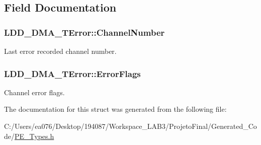 \subsection{Field Documentation}
\hypertarget{struct_l_d_d___d_m_a___t_error_abc8d0c6909178bc7fe3957b7c01afd08}{
\subsubsection[{Channel\-Number}]{ L\-D\-D\-\_\-\-D\-M\-A\-\_\-\-T\-Error\-::\-Channel\-Number}}\label{struct_l_d_d___d_m_a___t_error_abc8d0c6909178bc7fe3957b7c01afd08}
Last error recorded channel number. \hypertarget{struct_l_d_d___d_m_a___t_error_a9dd0a645e1763b4daa0058b1b29c4ad7}{
\subsubsection[{Error\-Flags}]{ L\-D\-D\-\_\-\-D\-M\-A\-\_\-\-T\-Error\-::\-Error\-Flags}}\label{struct_l_d_d___d_m_a___t_error_a9dd0a645e1763b4daa0058b1b29c4ad7}
Channel error flags. 

The documentation for this struct was generated from the following file\-:\begin{DoxyCompactItemize}
\item 
C\-:/\-Users/ea076/\-Desktop/194087/\-Workspace\-\_\-\-L\-A\-B3/\-Projeto\-Final/\-Generated\-\_\-\-Code/\hyperlink{_p_e___types_8h}{P\-E\-\_\-\-Types.\-h}\end{DoxyCompactItemize}
